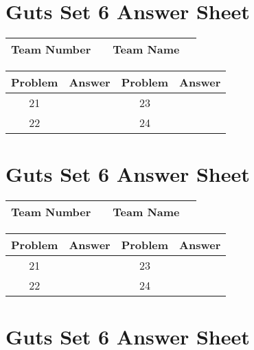 \documentclass[14pt]{article}
\begin{document}
\section*{Guts Set 6 Answer Sheet}

\begin{center}
\begin{tabular}{|r|r|r|r|}
\hline
	Team Number & \hspace{10em} &
	Team Name & \hspace{15em} \\ \hline
\end{tabular}
\end{center}
\begin{tabularx}{\textwidth}{|c|l|c|X|}\hline
	Problem & Answer & Problem & Answer \\\hline
	21 & \hspace{15em} & 23 & \\\hline
	22 & & 24 & \\\hline
\end{tabularx}

\vspace{30px}

\section*{Guts Set 6 Answer Sheet}

\begin{center}
\begin{tabular}{|r|r|r|r|}
\hline
	Team Number & \hspace{10em} &
	Team Name & \hspace{15em} \\ \hline
\end{tabular}
\end{center}
\begin{tabularx}{\textwidth}{|c|l|c|X|}\hline
	Problem & Answer & Problem & Answer \\\hline
	21 & \hspace{15em} & 23 & \\\hline
	22 & & 24 & \\\hline
\end{tabularx}

\vspace{30px}

\section*{Guts Set 6 Answer Sheet}
\end{document}
